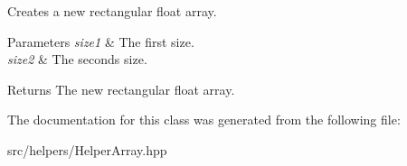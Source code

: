 Creates a new rectangular float array. 


\begin{DoxyParams}{Parameters}
{\em size1} & The first size. \\
\hline
{\em size2} & The seconds size. \\
\hline
\end{DoxyParams}
\begin{DoxyReturn}{Returns}
The new rectangular float array. 
\end{DoxyReturn}


The documentation for this class was generated from the following file\+:\begin{DoxyCompactItemize}
\item 
src/helpers/Helper\+Array.\+hpp\end{DoxyCompactItemize}
